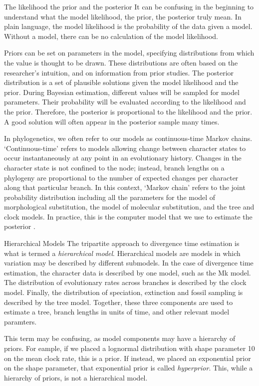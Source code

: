 \begin{boxedtext}{The likelihood the prior and the posterior} 
It can be confusing in the beginning to understand what the model likelihood, the prior, the posterior truly mean.
In plain language, the model likelihood is the probability of the data given a model.
Without a model, there can be no calculation of the model  likelihood.

Priors can be set on parameters in the model, specifying distributions from which the value is thought to be drawn.
These distributions are often based on the researcher's intuition, and on information from prior studies.
The posterior distribution is a set of plausible solutions given the model likelihood and the prior.
During Bayesian estimation, different values will be sampled for model parameters.
Their probability will be evaluated according to the likelihood and the prior.
Therefore, the posterior is proportional to the likelihood and the prior.
A good solution will often appear in the posterior sample many times.

In phylogenetics, we often refer to our models as continuous-time Markov chains.
`Continuous-time' refers to models allowing change between character states to occur instantaneously at any point in an evolutionary history.
Changes in the character state is not confined to the node; instead, branch lengths on a phylogeny are proportional to the number of expected changes per character along that particular branch. 
In this context, `Markov chain' refers to the  joint probability distribution including all the parameters for the model of morphological substitution, the model of molecular substitution, and the tree and clock models. 
In practice, this is the computer model that we use to estimate the posterior \cite{Hoehna2016b}.
\end{boxedtext}

\begin{boxedtext}{Hierarchical Models}
The tripartite approach to divergence time estimation is what is termed a \textit{hierarchical model}. 
Hierarchical models are models in which variation may be described by different submodels.
In the case of divergence time estimation, the character data is described by one model, such as the Mk model.
The distribution of evolutionary rates across branches is described by the clock model.
Finally, the distribution of speciation, extinction and fossil sampling is described by the tree model.
Together, these three components are used to estimate a tree, branch lengths in units of time, and other relevant model paramters.

This term may be confusing, as model components may have a hierarchy of priors. 
For eample, if we placed a lognormal distribution with shape parameter 10 on the mean clock rate, this is a prior.
If instead, we placed an exponential prior on the shape parameter, that exponential prior is called \textit{hyperprior}.
This, while a hierarchy of priors, is not a hierarchical model. 
\end{boxedtext}

